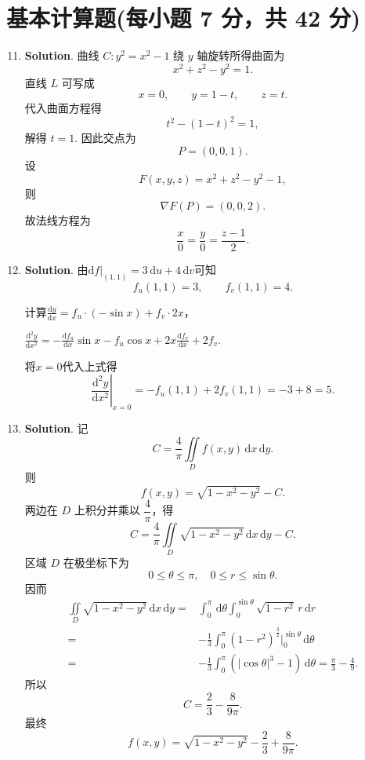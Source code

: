 \documentclass[../Main.tex]{subfiles}
\begin{document}
\section{基本计算题(每小题 7 分，共 42 分)}
\begin{enumerate}
  \setcounter{enumi}{10}
  \item \textbf{Solution}. 曲线 \(C:y^2=x^2-1\) 绕 \(y\) 轴旋转所得曲面为
        \[
          x^2+z^2-y^2=1.
        \]
        直线 \(L\) 可写成
        \[
          x=0,\qquad y=1-t,\qquad z=t.
        \]
        代入曲面方程得
        \[
          t^2-(1-t)^2=1,
        \]
        解得 \(t=1\). 因此交点为
        \[
          P=(0,0,1).
        \]
        设
        \[
          F(x,y,z)=x^2+z^2-y^2-1,
        \]
        则
        \[
          \nabla F(P)=(0,0,2).
        \]
        故法线方程为
        \[
          \frac{x}{0}=\frac{y}{0}=\frac{z-1}{2}.
        \]

  \item \textbf{Solution}. 由$\left.\mathrm{d}f\right|_{(1,1)}=3\,\mathrm{d}u+4\,\mathrm{d}v$可知
        \[
          f_u(1,1)=3,\qquad f_v(1,1)=4.
        \]

        计算$\frac{\mathrm{d}y}{\mathrm{d}x}=f_u \cdot (-\sin x)+f_v \cdot 2x$，

        $\frac{\mathrm{d}^2 y}{\mathrm{d}x^2}=-\frac{\mathrm{d}f_u}{\mathrm{d}x}\sin x-f_u\cos x + 2x\frac{\mathrm{d}f_v}{\mathrm{d}x} + 2f_v$.

        将$x=0$代入上式得
        \[
          \left.\frac{\mathrm{d}^2 y}{\mathrm{d}x^2}\right|_{x=0}=-f_u(1,1)+2f_v(1,1)=-3+8=5.
        \]

  \item \textbf{Solution}. 记
        \[
          C=\frac{4}{\pi}\iint\limits_{D} f(x,y)\,\mathrm{d}x\,\mathrm{d}y.
        \]
        则
        \[
          f(x,y)=\sqrt{1-x^2-y^2}-C.
        \]
        两边在 \(D\) 上积分并乘以 \(\dfrac4\pi\)，得
        \[
          C=\frac{4}{\pi}\iint\limits_D\sqrt{1-x^2-y^2}\,\mathrm{d}x\,\mathrm{d}y-C.
        \]
        区域 \(D\) 在极坐标下为
        \[
          0\le \theta\le \pi,\quad 0\le r\le \sin\theta.
        \]
        因而
        \[
          \begin{aligned}
            \iint\limits_D\sqrt{1-x^2-y^2}\,\mathrm{d}x\,\mathrm{d}y
            = & \int_0^\pi\,\mathrm{d}\theta\int_0^{\sin\theta}\sqrt{1-r^2}\,r\,\mathrm{d}r                         \\
            = & -\frac{1}{3}\int_{0}^{\pi}\left(1-r^2\right)^{\frac{3}{2}}\bigg|_{0}^{\sin\theta}\,\mathrm{d}\theta \\
            = & -\frac{1}{3}\int_0^\pi\left(|\cos\theta|^3-1\right)\,\mathrm{d}\theta=\frac{\pi}{3}-\frac{4}{9}.
          \end{aligned}
        \]
        所以
        \[
          C=\frac{2}{3}-\frac{8}{9\pi}.
        \]
        最终
        \[
          f(x,y)=\sqrt{1-x^2-y^2}-\frac23+\frac{8}{9\pi}.
        \]


\end{enumerate}
\end{document}

